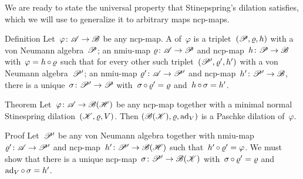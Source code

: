 \documentclass[b]{subfiles}
\begin{document}
\begin{parsec}%
\begin{point}%
    We are ready to state the universal
        property that Stinepspring's dilation satisfies,
        which we will use to generalize it to arbitrary maps ncp-maps.
\end{point}
\begin{point}{Definition}%
    Let~$\varphi\colon \mathscr{A} \to \mathscr{B}$
        be any ncp-map.
    A  of~$\varphi$
    is a triplet~$(\mathscr{P}, \varrho, h)$
    with a von Neumann algebra~$\mathscr{P}$;
    an nmiu-map $\varrho \colon \mathscr{A} \to \mathscr{P}$
    and ncp-map~$h \colon \mathscr{P} \to \mathscr{B}$
    with~$\varphi = h \mathop{\circ} \varrho$
    such that for every other
    such triplet~$(\mathscr{P}', \varrho', h')$
    with a von Neumann algebra~$\mathscr{P}'$;
    an nmiu-map $\varrho'\colon \mathscr{A} \to \mathscr{P}'$
    and ncp-map~$h' \colon \mathscr{P}' \to \mathscr{B}$,
    there is a unique~$\sigma \colon \mathscr{P}' \to \mathscr{P}$
    with~$\sigma \mathop{\circ} \varrho' = \varrho$
    and~$h \mathop{\circ} \sigma = h'$.
    \par %
\end{point}
\begin{point}{Theorem}%
Let~$\varphi\colon \mathscr{A} \to \mathscr{B}(\mathscr{H})$
    be any ncp-map
    together with a minimal normal Stinespring dilation~$(\mathscr{K},\varrho,V)$.
    Then $(\mathscr{B}(\mathscr{K}), \varrho, \mathrm{ad}_V)$
        is a Paschke dilation of~$\varphi$.

\begin{point}{Proof}%
Let~$\mathscr{P}'$ be any von Neumann algebra
    together with nmiu-map~$\varrho'\colon \mathscr{A} \to \mathscr{P}'$
    and ncp-map~$h'\colon \mathscr{P}' \to \mathscr{B}(\mathscr{H})$
    such that~$h' \mathop{\circ} \varrho' = \varphi$.
We must show that there is a unique
    ncp-map~$\sigma\colon \mathscr{P}' \to \mathscr{B}(\mathscr{K})$
    with~$\sigma \mathop{\circ} \varrho' = \varrho$
    and~$\mathrm{ad}_V \mathop{\circ} \sigma = h'$.


\end{point}
\end{point}
\end{parsec}
\end{document}
